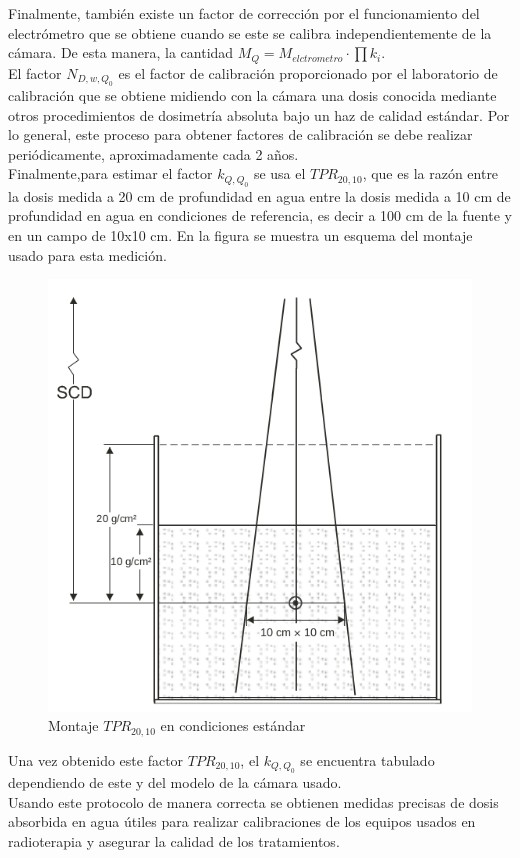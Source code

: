 Finalmente, también existe un factor de corrección por el funcionamiento del electrómetro que se obtiene cuando se este se calibra independientemente de la cámara. De esta manera, la cantidad $M_Q=M_{elctrometro}\cdot \prod k_i$.\\

El factor $N_{D,w,Q_{0}}$ es el factor de calibración proporcionado por el laboratorio de calibración que se obtiene midiendo con la cámara una dosis conocida mediante otros procedimientos de dosimetría absoluta bajo un haz de calidad estándar. Por lo general, este proceso para obtener factores de calibración se debe realizar periódicamente, aproximadamente cada 2 años.\\

Finalmente,para estimar el factor $k_{Q,Q_{0}}$ se usa el $TPR_{20,10}$, que es la razón entre la dosis medida a 20 cm de profundidad en agua entre la dosis medida a 10 cm de profundidad en agua en condiciones de referencia, es decir a 100 cm de la fuente y en un campo de 10x10 cm. En la figura se muestra un esquema del montaje usado para esta medición.\\
 \begin{figure}[H]
 	\centering
 	\includegraphics[width=0.7\linewidth]{images/TPR2010.png}
 	\caption{Montaje $TPR_{20,10} $ en condiciones estándar\cite{TPR398}}
 	\label{fig:TPR2010}
 \end{figure}
Una vez obtenido este factor $TPR_{20,10}$, el $k_{Q,Q_{0}}$ se encuentra tabulado dependiendo de este y del modelo de la cámara usado\cite{TPR398}.\\

Usando este protocolo de manera correcta se obtienen medidas precisas de dosis absorbida en agua útiles para realizar calibraciones de los equipos usados en radioterapia y asegurar la calidad de los tratamientos.\\


